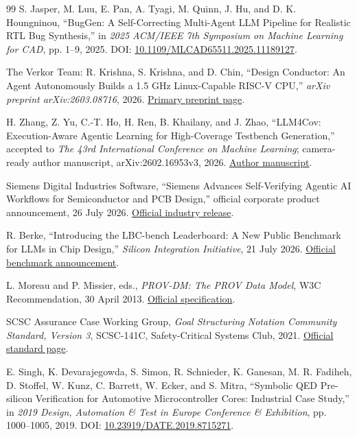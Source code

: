 \documentclass[UTF8,a4paper,zihao=-4,oneside]{ctexart}
\begin{document}
\begin{thebibliography}{99}
S. Jasper, M. Luu, E. Pan, A. Tyagi, M. Quinn, J. Hu, and D. K. Houngninou,
``BugGen: A Self-Correcting Multi-Agent LLM Pipeline for Realistic RTL Bug Synthesis,''
in \emph{2025 ACM/IEEE 7th Symposium on Machine Learning for CAD}, pp. 1--9, 2025.
DOI: \href{https://doi.org/10.1109/MLCAD65511.2025.11189127}{10.1109/MLCAD65511.2025.11189127}.

The Verkor Team: R. Krishna, S. Krishna, and D. Chin,
``Design Conductor: An Agent Autonomously Builds a 1.5 GHz Linux-Capable RISC-V CPU,''
\emph{arXiv preprint arXiv:2603.08716}, 2026.
\href{https://arxiv.org/abs/2603.08716}{Primary preprint page}.

H. Zhang, Z. Yu, C.-T. Ho, H. Ren, B. Khailany, and J. Zhao,
``LLM4Cov: Execution-Aware Agentic Learning for High-Coverage Testbench Generation,''
accepted to \emph{The 43rd International Conference on Machine Learning};
camera-ready author manuscript, arXiv:2602.16953v3, 2026.
\href{https://arxiv.org/abs/2602.16953}{Author manuscript}.

Siemens Digital Industries Software,
``Siemens Advances Self-Verifying Agentic AI Workflows for Semiconductor and PCB Design,''
official corporate product announcement, 26 July 2026.
\href{https://news.siemens.com/en-us/siemens-nvidia-dac-2026/}{Official industry release}.

R. Berke,
``Introducing the LBC-bench Leaderboard: A New Public Benchmark for LLMs in Chip Design,''
\emph{Silicon Integration Initiative}, 21 July 2026.
\href{https://si2.org/introducing-the-lbc-bench-leaderboard-a-new-public-benchmark-for-llms-in-chip-design/}{Official benchmark announcement}.

L. Moreau and P. Missier, eds.,
\emph{PROV-DM: The PROV Data Model}, W3C Recommendation, 30 April 2013.
\href{https://www.w3.org/TR/prov-dm/}{Official specification}.

SCSC Assurance Case Working Group,
\emph{Goal Structuring Notation Community Standard, Version 3},
SCSC-141C, Safety-Critical Systems Club, 2021.
\href{https://scsc.uk/scsc-141c}{Official standard page}.

E. Singh, K. Devarajegowda, S. Simon, R. Schnieder, K. Ganesan, M. R. Fadiheh,
D. Stoffel, W. Kunz, C. Barrett, W. Ecker, and S. Mitra,
``Symbolic QED Pre-silicon Verification for Automotive Microcontroller Cores:
Industrial Case Study,'' in \emph{2019 Design, Automation \& Test in Europe Conference
\& Exhibition}, pp. 1000--1005, 2019.
DOI: \href{https://doi.org/10.23919/DATE.2019.8715271}{10.23919/DATE.2019.8715271}.


\end{thebibliography}
\end{document}
